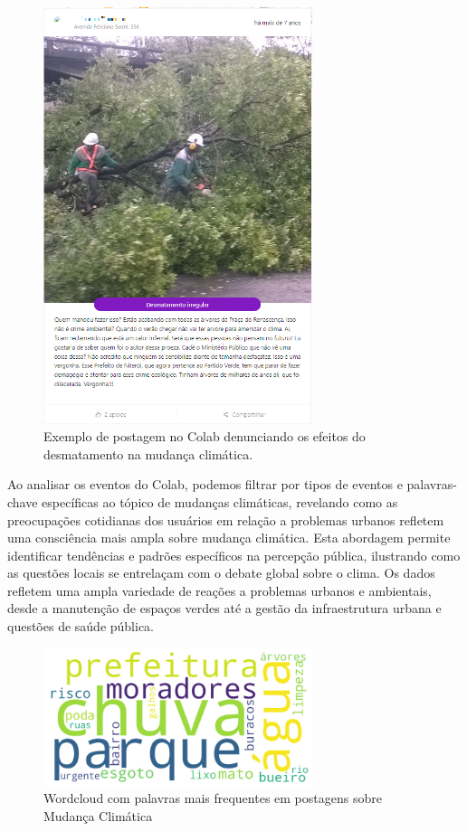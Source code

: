 \begin{figure}[htb]
	\centering
	\includegraphics[width=0.7\textwidth]{images/colab_posts_social_clima.png}
	\caption{Exemplo de postagem no Colab denunciando os efeitos do desmatamento na mudança climática.}
	\label{fig:colab_posts_social_clima}
\end{figure}

Ao analisar os eventos do Colab, podemos filtrar por tipos de eventos e palavras-chave específicas ao tópico de mudanças climáticas, revelando como as preocupações cotidianas dos usuários em relação a problemas urbanos refletem uma consciência mais ampla sobre mudança climática. Esta abordagem permite identificar tendências e padrões específicos na percepção pública, ilustrando como as questões locais se entrelaçam com o debate global sobre o clima. Os dados refletem uma ampla variedade de reações a problemas urbanos e ambientais, desde a manutenção de espaços verdes até a gestão da infraestrutura urbana e questões de saúde pública.

\begin{figure}[htb]
	\centering
	\includegraphics[width=0.7\textwidth]{images/wordcloud_weather.png}
	\caption{Wordcloud com palavras mais frequentes em postagens sobre Mudança Climática}
	\label{fig:wordcloud_weather}
\end{figure}

